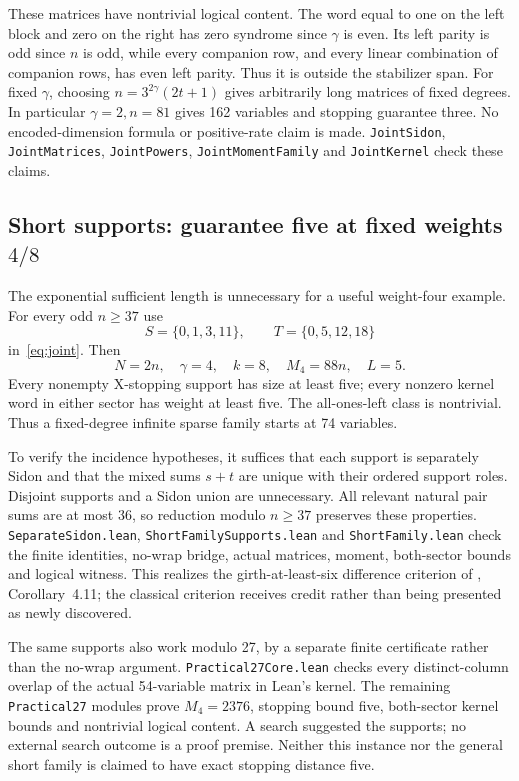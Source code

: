 \documentclass[11pt]{article}
\begin{document}
These matrices have nontrivial logical content. The word equal to one on the
left block and zero on the right has zero syndrome since $\gamma$ is even.
Its left parity is odd since $n$ is odd, while every companion row, and every
linear combination of companion rows, has even left parity. Thus it is outside
the stabilizer span. For fixed $\gamma$, choosing
$n=3^{2\gamma}(2t+1)$ gives arbitrarily long matrices of fixed degrees.
In particular $\gamma=2,n=81$ gives 162 variables and stopping guarantee three.
No encoded-dimension formula or positive-rate claim is made.
\texttt{JointSidon}, \texttt{JointMatrices}, \texttt{JointPowers},
\texttt{JointMomentFamily} and \texttt{JointKernel} check these claims.

\subsection{Short supports: guarantee five at fixed weights $4/8$}
The exponential sufficient length is unnecessary for a useful weight-four
example. For every odd $n\ge37$ use
\begin{equation}\label{eq:short}
 S=\{0,1,3,11\},\qquad T=\{0,5,12,18\}
\end{equation}
in~\eqref{eq:joint}. Then
\[
 N=2n,\quad \gamma=4,\quad k=8,\quad M_4=88n,\quad L=5.
\]
Every nonempty X-stopping support has size at least five; every nonzero kernel
word in either sector has weight at least five. The all-ones-left class is
nontrivial. Thus a fixed-degree infinite sparse family starts at 74 variables.

To verify the incidence hypotheses, it suffices that each support is separately
Sidon and that the mixed sums $s+t$ are unique with their ordered support roles.
Disjoint supports and a Sidon union are unnecessary. All relevant natural pair
sums are at most 36, so reduction modulo $n\ge37$ preserves these properties.
\texttt{SeparateSidon.lean}, \texttt{ShortFamilySupports.lean} and
\texttt{ShortFamily.lean} check the finite identities, no-wrap bridge, actual
matrices, moment, both-sector bounds and logical witness. This realizes the
girth-at-least-six difference criterion of \cite{ref1}, Corollary~4.11; the classical
criterion receives credit rather than being presented as newly discovered.

The same supports also work modulo 27, by a separate finite certificate rather
than the no-wrap argument. \texttt{Practical27Core.lean} checks every
distinct-column overlap of the actual 54-variable matrix in Lean's kernel.
The remaining \texttt{Practical27} modules prove
$M_4=2376$, stopping bound five, both-sector kernel bounds and nontrivial
logical content. A search suggested the supports; no external search outcome
is a proof premise. Neither this instance nor the general short family is
claimed to have exact stopping distance five.
\end{document}
